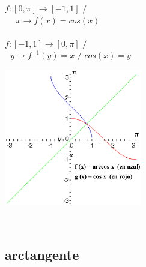 \hfill
\begin{minipage}{.45\textwidth}

\begin{center}
$f:[ 0, \pi] \longrightarrow [-1,1] $ $/$ \qquad $ $\\
$ $ \qquad $ $ \qquad $ $ \qquad $ $ \qquad $ x \longrightarrow f(x) = cos(x)$\\
\qquad \\

$f: [-1,1] \longrightarrow [0, \pi] $ $/$ \qquad $ $\\
$ $ \qquad $ $ \qquad $ y \longrightarrow f^{-1}(y) = x$ $/$ $ cos(x)=y$\\
\end{center}

\end{minipage}
\hfill 
\begin{minipage}{.50\textwidth}

\includegraphics[height=6cm,width=6cm]{arccos.eps}

\end{minipage}
\hfill \\

\subsection{arctangente}

